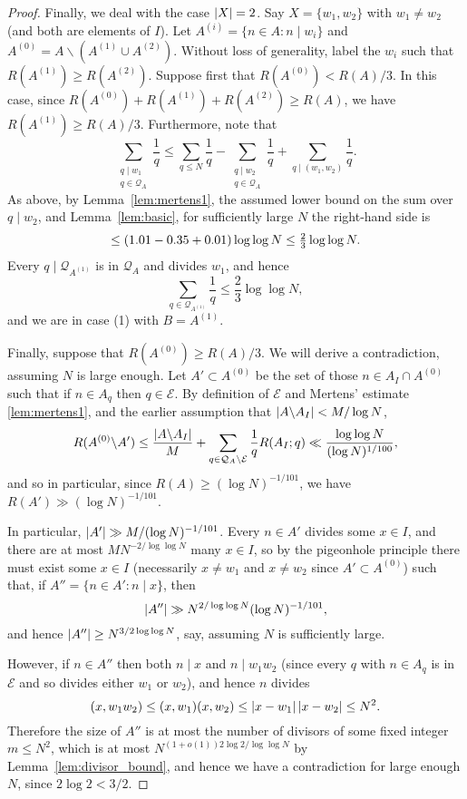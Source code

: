 \begin{proof}
Finally, we deal with the case $\left\lvert X\right\rvert=2$. Say $X=\{w_1,w_2\}$ with $w_1\neq w_2$ (and both are elements of $I$). Let $A^{(i)}=\{n\in A: n\mid w_i\}$ and $A^{(0)}=A\backslash (A^{(1)}\cup A^{(2)})$. Without loss of generality, label the $w_i$ such that $R(A^{(1)})\geq R(A^{(2)})$.  Suppose first that $R(A^{(0)})<R(A)/3$. In this case, since $R(A^{(0)})+R(A^{(1)})+R(A^{(2)})\geq R(A)$, we have $R(A^{(1)})\geq R(A)/3$. Furthermore, note that
\[\sum_{\substack{q\mid w_1\\ q\in \mathcal{Q}_A}}\frac{1}{q}\leq \sum_{q\leq N}\frac{1}{q}-\sum_{\substack{q\mid w_2\\ q\in \mathcal{Q}_A}}\frac{1}{q}+\sum_{q\mid (w_1,w_2)}\frac{1}{q}.\]
As above, by Lemma~\ref{lem:mertens1}, the assumed lower bound on the sum over $q\mid w_2$, and Lemma~\ref{lem:basic}, for sufficiently large $N$ the right-hand side is
\[\leq \left( 1.01-0.35+0.01\right)\log\log N\leq \tfrac{2}{3}\log\log N.\]
Every $q\mid \mathcal{Q}_{A^{(1)}}$ is in $\mathcal{Q}_A$ and divides $w_1$, and hence
\[\sum_{q\in \mathcal{Q}_{A^{(1)}}}\frac{1}{q}\leq\frac{2}{3}\log\log N,\]
and we are in case (1) with $B=A^{(1)}$.

Finally, suppose that $R(A^{(0)})\geq R(A)/3$. We will derive a contradiction, assuming $N$ is large enough.  Let $A'\subset A^{(0)}$ be the set of those $n\in A_I\cap A^{(0)}$ such that if $n\in A_q$ then $q\in\mathcal{E}$. By definition of $\mathcal{E}$ and Mertens' estimate \ref{lem:mertens1}, and the earlier assumption that $\left\lvert A\backslash A_I\right\rvert<M/\log N$, 
  \[R(A^{(0)}\backslash A')\leq \frac{\left\lvert A\backslash A_I\right\rvert}{M}+\sum_{q\in\mathcal{Q}_A\backslash \mathcal{E}}\frac{1}{q}R(A_I;q)\ll \frac{\log\log N}{(\log N)^{1/100}},\]
  and so  in particular, since $R(A)\geq (\log N)^{-1/101}$, we have $R(A')\gg (\log N)^{-1/101}$.

  In particular, $\left\lvert A'\right\rvert\gg M/(\log N)^{-1/101}$. Every $n\in A'$ divides some $x\in I$, and there are at most $MN^{-2/\log\log N}$ many $x\in I$, so by the pigeonhole principle there must exist some $x\in I$ (necessarily $x\neq w_1$ and $x\neq w_2$ since $A'\subset A^{(0)}$) such that, if $A''=\{ n\in A' : n\mid x\}$, then
  \[\left\lvert A''\right\rvert\gg N^{2/\log\log N}(\log N)^{-1/101},\]
  and hence $\left\lvert A''\right\rvert\geq N^{3/2\log\log N}$, say, assuming $N$ is sufficiently large.

  However, if $n\in A''$ then both $n\mid x$ and $n\mid w_1w_2$ (since every $q$ with $n\in A_q$ is in $\mathcal{E}$ and so divides either $w_1$ or $w_2$), and hence $n$ divides
  \[(x,w_1w_2)\leq (x,w_1)(x,w_2)\leq \left\lvert x-w_1\right\rvert\left\lvert x-w_2\right\rvert\leq N^2.\]
  Therefore the size of $A''$ is at most the number of divisors of some fixed integer $m\leq N^2$, which is at most $N^{(1+o(1))2\log 2/\log\log N}$ by Lemma~\ref{lem:divisor_bound}, and hence we have a contradiction for large enough $N$, since $2\log 2< 3/2$.
\end{proof}

